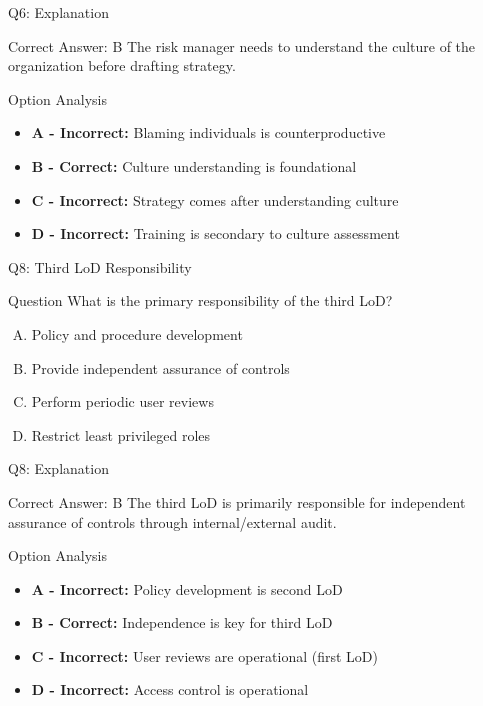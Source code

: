 \documentclass{beamer}
\begin{document}
	\begin{frame}{Q6: Explanation}
		\begin{block}{Correct Answer: B}
			The risk manager needs to understand the culture of the organization before drafting strategy.
		\end{block}
		\begin{block}{Option Analysis}
			\begin{itemize}
				\item \textbf{A - Incorrect:} Blaming individuals is counterproductive
				\item \textbf{B - Correct:} Culture understanding is foundational
				\item \textbf{C - Incorrect:} Strategy comes after understanding culture
				\item \textbf{D - Incorrect:} Training is secondary to culture assessment
			\end{itemize}
		\end{block}
	\end{frame}
	
	
	
	\begin{frame}{Q8: Third LoD Responsibility}
		\begin{block}{Question}
			What is the primary responsibility of the third LoD?
		\end{block}
		\begin{enumerate}[(A)]
			\item Policy and procedure development
			\item Provide independent assurance of controls
			\item Perform periodic user reviews
			\item Restrict least privileged roles
		\end{enumerate}
	\end{frame}
	
	\begin{frame}{Q8: Explanation}
		\begin{block}{Correct Answer: B}
			The third LoD is primarily responsible for independent assurance of controls through internal/external audit.
		\end{block}
		\begin{block}{Option Analysis}
			\begin{itemize}
				\item \textbf{A - Incorrect:} Policy development is second LoD
				\item \textbf{B - Correct:} Independence is key for third LoD
				\item \textbf{C - Incorrect:} User reviews are operational (first LoD)
				\item \textbf{D - Incorrect:} Access control is operational
			\end{itemize}
		\end{block}
	\end{frame}
	
\end{document}
